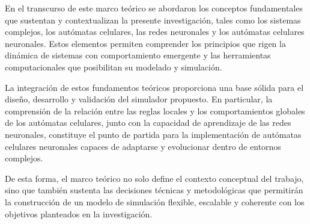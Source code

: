 En el transcurso de este marco teórico se abordaron los conceptos fundamentales que sustentan y contextualizan la presente investigación, tales como los sistemas complejos, los autómatas celulares, las redes neuronales y los autómatas celulares neuronales. Estos elementos permiten comprender los principios que rigen la dinámica de sistemas con comportamiento emergente y las herramientas computacionales que posibilitan su modelado y simulación.

La integración de estos fundamentos teóricos proporciona una base sólida para el diseño, desarrollo y validación del simulador propuesto. En particular, la comprensión de la relación entre las reglas locales y los comportamientos globales de los autómatas celulares, junto con la capacidad de aprendizaje de las redes neuronales, constituye el punto de partida para la implementación de autómatas celulares neuronales capaces de adaptarse y evolucionar dentro de entornos complejos.

De esta forma, el marco teórico no solo define el contexto conceptual del trabajo, sino que también sustenta las decisiones técnicas y metodológicas que permitirán la construcción de un modelo de simulación flexible, escalable y coherente con los objetivos planteados en la investigación.

\clearpage
